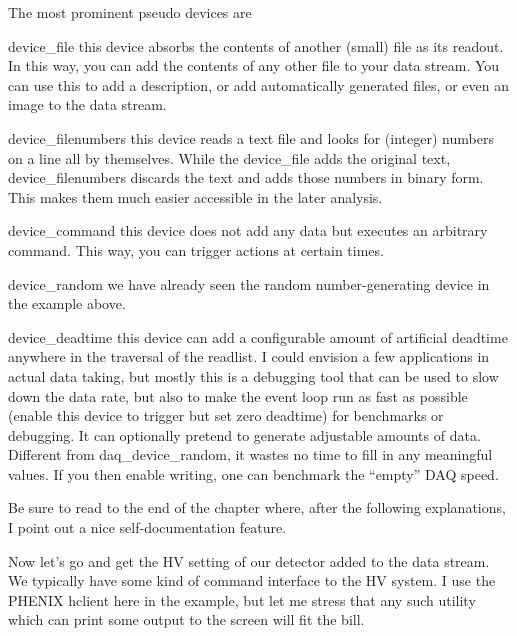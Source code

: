 \documentclass{article}[11pt]
\begin{document}
The most prominent pseudo devices are 
\begin{description}

\item{device\_file} this device absorbs the contents of another
  (small) file as its readout. In this way, you can add the contents
  of any other file to your data stream. You can use this to add a
  description, or add automatically generated files, or even an image to
  the data stream.

\item{device\_filenumbers} this device reads a text file and looks for
  (integer) numbers on a line all by themselves. While the
  device\_file adds the original text, device\_filenumbers discards
  the text and adds those numbers in binary form.  This makes them
  much easier accessible in the later analysis.

\item{device\_command} this device does not add any data but executes
  an arbitrary command.  This way, you can trigger actions at certain times.

\item{device\_random} we have already seen the random
  number-generating device in the example above.

\item{device\_deadtime} this device can add a configurable amount of
  artificial deadtime anywhere in the traversal of the readlist.  I
  could envision a few applications in actual data taking, but mostly
  this is a debugging tool that can be used to slow down the data
  rate, but also to make the event loop run as fast as possible
  (enable this device to trigger but set zero deadtime) for benchmarks
  or debugging. It can optionally pretend to generate adjustable
  amounts of data. Different from daq\_device\_random, it wastes no
  time to fill in any meaningful values. If you then enable writing, 
  one can benchmark the ``empty'' DAQ speed. 


\end{description}

Be sure to read to the end of the chapter where, after the following
explanations, I point out a nice self-documentation feature.

Now let's go and get the HV setting of our detector added to the data
stream. We typically have some kind of command interface to the HV
system. I use the PHENIX hclient here in the example, but let me
stress that any such utility which can print some output to the screen
will fit the bill.
\end{document}
